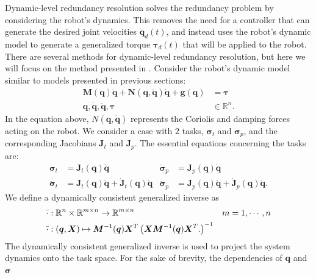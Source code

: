 Dynamic-level redundancy resolution solves the redundancy problem by considering
the robot's dynamics. This removes the need for a controller that can generate
the desired joint velocities $\dot{\bm{q}}_d(t)$, and instead uses the robot's
dynamic model to generate a generalized torque $\bm{\tau}_d(t)$ that will
be applied to the robot. There are several methods for dynamic-level redundancy
resolution, but here we will focus on the method presented in \cite{khatib2004}.
Consider the robot's dynamic model similar to models presented in previous sections:
\begin{subequations}
\begin{align}
    \bm{M}(\bm{q}) \ddot{\bm{q}} + \bm{N}(\bm{q}, \dot{\bm{q}}) \dot{\bm{q}} + \bm{g}(\bm{q}) &= \bm{\tau} \\
    \bm{q}, \dot{\bm{q}} ,\ddot{\bm{q}},\bm{\tau} &\in \mathbb{R}^n.
\end{align}
\end{subequations}
In the equation above, $N(\bm{q}, \dot{\bm{q}})$ represents the Coriolis and
damping forces acting on the robot. We consider a case with $2$ tasks, $\bm{\sigma}_t$
and $\bm{\sigma}_p$, and the corresponding Jacobians $\bm{J}_t$ and $\bm{J}_p$.
The essential equations concerning the tasks are:
\begin{subequations}
    \begin{align}
        \dot{\bm{\sigma}}_t &= \bm{J}_t(\bm{q}) \dot{\bm{q}} & \dot{\bm{\sigma}}_p &= \bm{J}_p(\bm{q}) \dot{\bm{q}} \\
        \ddot{\bm{\sigma}}_t &= \bm{J}_t(\bm{q}) \ddot{\bm{q}} + \dot{\bm{J}}_t(\bm{q}) \dot{\bm{q}} &
        \ddot{\bm{\sigma}}_p &= \bm{J}_p(\bm{q}) \ddot{\bm{q}} + \dot{\bm{J}}_p(\bm{q}) \dot{\bm{q}}.
    \end{align}
\end{subequations}
We define a dynamically consistent generalized inverse \cite{khatib1987} as
\begin{subequations}
    \begin{align}
        \bar{\cdot} &: \mathbb{R}^n \times \mathbb{R}^{m\times n} \rightarrow \mathbb{R}^{m\times n} & m &= 1, \cdots, n\\
        \bar{\cdot} &: (\bm{q},\bm{X}) \mapsto \bm{M}^{-1}(\bm{q})\bm{X}^T\left(
            \bm{X}\bm{M}^{-1}(\bm{q})\bm{X}^T.
        \right)^{-1}
    \end{align}
\end{subequations}
The dynamically consistent generalized inverse is used to project the system dynamics
onto the task space. For the sake of brevity, the dependencies of $\bm{q}$ and $\bm{\sigma}$
